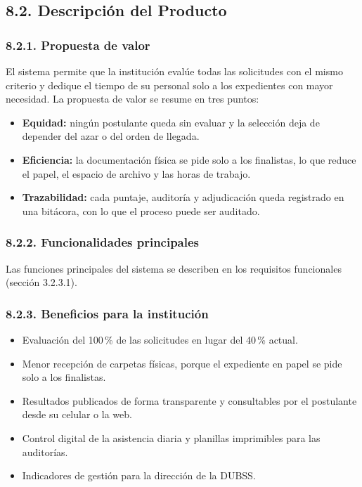 \subsection{8.2. Descripción del Producto}

\subsubsection{8.2.1. Propuesta de valor}

El sistema permite que la institución evalúe todas las solicitudes con el mismo criterio y dedique el tiempo de su personal solo a los expedientes con mayor necesidad. La propuesta de valor se resume en tres puntos:

\begin{itemize}
    \item \textbf{Equidad:} ningún postulante queda sin evaluar y la selección deja de depender del azar o del orden de llegada.
    \item \textbf{Eficiencia:} la documentación física se pide solo a los finalistas, lo que reduce el papel, el espacio de archivo y las horas de trabajo.
    \item \textbf{Trazabilidad:} cada puntaje, auditoría y adjudicación queda registrado en una bitácora, con lo que el proceso puede ser auditado.
\end{itemize}

\subsubsection{8.2.2. Funcionalidades principales}

Las funciones principales del sistema se describen en los requisitos funcionales (sección 3.2.3.1).

\subsubsection{8.2.3. Beneficios para la institución}

\begin{itemize}
    \item Evaluación del 100\,\% de las solicitudes en lugar del 40\,\% actual.
    \item Menor recepción de carpetas físicas, porque el expediente en papel se pide solo a los finalistas.
    \item Resultados publicados de forma transparente y consultables por el postulante desde su celular o la web.
    \item Control digital de la asistencia diaria y planillas imprimibles para las auditorías.
    \item Indicadores de gestión para la dirección de la DUBSS.
\end{itemize}

